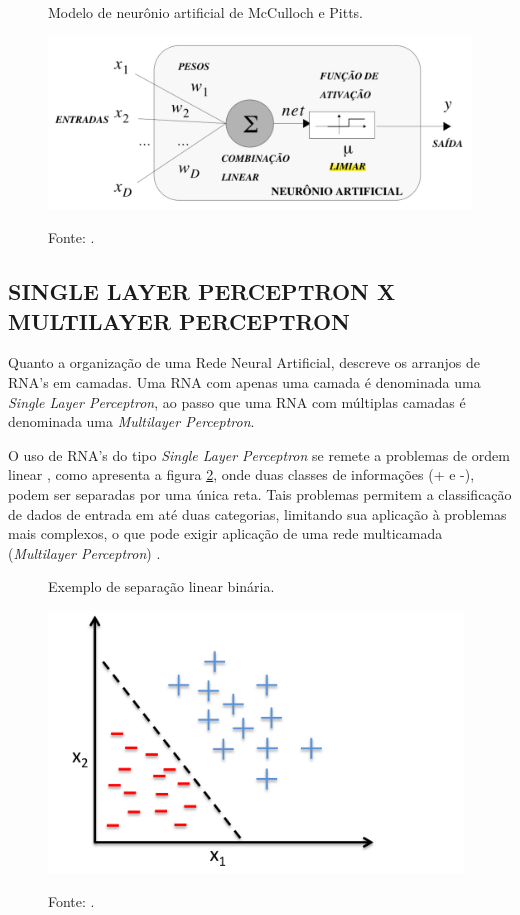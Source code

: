 \begin{figure}[H]
	\caption{Modelo de neurônio artificial de McCulloch e Pitts.}
	\centering %
	\includegraphics[width=12cm]{resources/modelo_neuronio.png} %
	\label{figura:modelo_neuronio}
	\captionsetup{singlelinecheck = false, format= hang, justification=raggedright, labelsep=space, width=12cm}
	\caption*{\footnotesize Fonte: .}
\end{figure}

\subsection{SINGLE LAYER PERCEPTRON X MULTILAYER PERCEPTRON}

Quanto a organização de uma Rede Neural Artificial,  descreve os arranjos de RNA's em camadas. Uma RNA com apenas uma camada é denominada uma \textit{Single Layer Perceptron}, ao passo que uma RNA com múltiplas camadas é denominada uma \textit{Multilayer Perceptron}.

O uso de RNA's do tipo \textit{Single Layer Perceptron} se remete a problemas de ordem linear \cite{haykin2009neural}, como apresenta a figura \ref{figura:perceptron_binary}, onde duas classes de informações (+ e -), podem ser separadas por uma única reta. Tais problemas permitem a classificação de dados de entrada em até duas categorias, limitando sua aplicação à problemas mais complexos, o que pode exigir aplicação de uma rede multicamada (\textit{Multilayer Perceptron}) \cite{fausett1994fundamentals}.

\begin{figure}[H]
	\caption{Exemplo de separação linear binária.}
	\centering %
	\includegraphics[width=11cm]{resources/perceptron_binary.png} %
	\label{figura:perceptron_binary}
	\captionsetup{singlelinecheck = false, format= hang, justification=raggedright, labelsep=space, width=11cm}
	\caption*{\footnotesize Fonte: .}
\end{figure}

